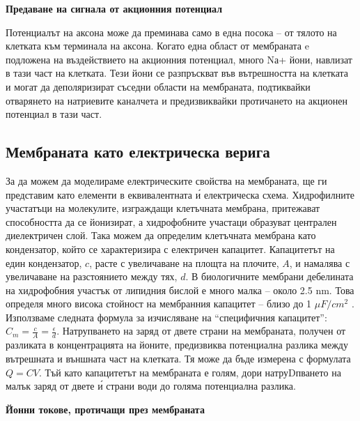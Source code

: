 \documentclass{article}
\numberwithin{equation}{section}
\begin{document}
\vspace{5mm} %
\textbf{Предаване на сигнала от акционния потенциал}

Потенциалът на аксона може да преминава само в една посока -- от тялото на клетката към терминала на аксона. Когато една област от
мембраната e подложена на въздействието на акционния потенциал, много Nа+ йони, навлизат в тази част на клетката. Тези йони се разпръскват
във вътрешността на клетката и могат да деполяризират съседни области на мембраната, подтиквайки отварянето на натриевите каналчета и
предизвиквайки протичането на акционен потенциал в тази част.

\vspace{5mm} %
\subsection{Мембраната като електрическа верига}

За да можем да моделираме електрическите свойства на мембраната, ще ги представим като елементи в еквивалентната \'{и} електрическа схема.
Хидрофилните участатъци на молекулите, изграждащи клетъчната мембрана, притежават способността да се йонизират, а хидрофобните участаци
образуват централен диелектричен слой. Така можем да определим клетъчната мембрана като кондензатор, който се характеризира с електричен
капацитет. Капацитетът на един кондензатор, $c$, расте с увеличаване на площта на плочите, $A$, и намалява с увеличаване на разстоянието
между тях, $d$. В биологичните мембрани дебелината на хидрофобния участък от липидния бислой е много малка – около 2.5 nm. Това определя
много висока стойност на мембранния капацитет – близо до 1 $\mu F/cm^2$ .  Използваме следната формула за изчисляване на “специфичния
капацитет”: $C_{m}=\frac{c}{A}=\frac{\epsilon}{d}$. Натрупването на заряд от двете страни на мембраната, получен от разликата в
концентрацията на йоните, предизвиква потенциална разлика между вътрешната и външната част на клетката. Тя може да бъде измерена с формулата
$Q=CV$. Тъй като капацитетът на мембраната е голям, дори натруDпването на малък заряд от двете \'{и} страни води до голяма потенциална
разлика. 

\vspace{5mm} %
\textbf{Йонни токове, протичащи през мембраната}
\end{document}
